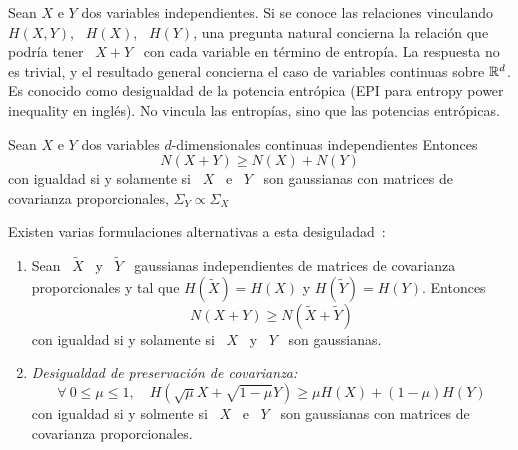 

Sean  $X$ e  $Y$  dos variables  independientes.   Si se  conoce las  relaciones
vinculando \  $H(X,Y)$, \  $H(X)$, \ $H(Y)$,  una pregunta natural  concierna la
relaci\'on  que podr\'ia  tener \  $X+Y$  \ con  cada variable  en t\'ermino  de
entrop\'ia. La respuesta no es trivial, y el resultado general concierna el caso
de  variables continuas  sobre $\mathbb{R}^d$.   Es conocido  como desigualdad  de la
potencia entr\'opica (EPI para entropy power inequality en ingl\'es). No vincula
las entrop\'ias, sino que las potencias entr\'opicas.
%
\begin{teorema}
  Sean  $X$  e $Y$  dos  variables  $d$-dimensionales continuas  independientes
  Entonces
  \[
  N(X + Y) \ge N(X) + N(Y)
  \]
%
  con igualdad si y  solamente si \ $X$ \ e \ $Y$  \ son gaussianas con matrices
  de covarianza proporcionales, $\Sigma_Y \propto \Sigma_X$
\end{teorema}
%
\noindent     Existen    varias     formulaciones     alternativas    a     esta
desiguladad~\cite{Sha48, Lie78, CovTho06, DemCov91, Rio07}:
%
\begin{enumerate}
\item\label{EPI:SZ:EquivGauss} Sean  \ $\widetilde{X}$  \ y \  $\widetilde{Y}$ \
  gaussianas independientes  de matrices de covarianza proporcionales  y tal que
  $H(\widetilde{X}) = H(X)$ y $H(\widetilde{Y}) = H(Y)$.  Entonces
  \[
  N(X+Y) \ge N\left( \widetilde{X} + \widetilde{Y} \right)
  \]
  con igualdad si y solamente si \ $X$ \ y \ $Y$ \ son gaussianas.
%
\item\label{EPI:SZ:PresCov}    {\it    Desigualdad    de    preservaci\'on    de
    covarianza:}
  \[
  \forall  \:   0  \le  \mu  \le   1,  \quad  H\left(   \sqrt{\mu}  X  +
    \sqrt{1-\mu} Y \right) \ge \mu H(X) + (1-\mu) H(Y)
  \]
  con igualdad si y solmente si \ $X$ \ e \ $Y$ \ son gaussianas con matrices de
  covarianza proporcionales.
\end{enumerate}
%

